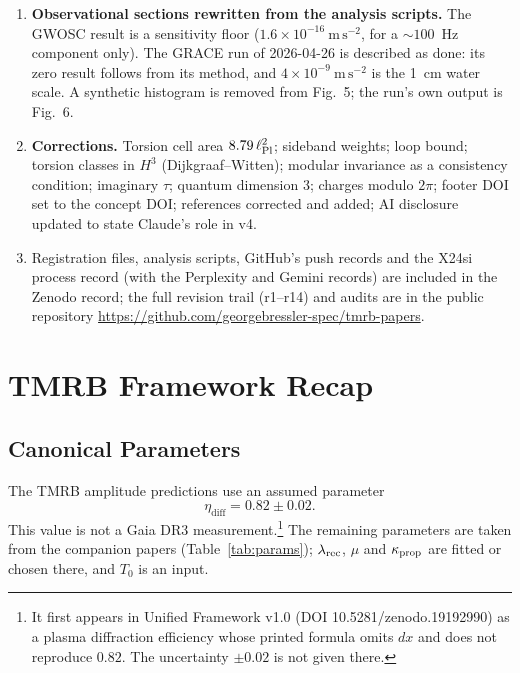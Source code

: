 \documentclass[11pt,a4paper]{article}
\begin{document}
\begin{enumerate}[leftmargin=*, label=\textit{(\roman*)}, itemsep=1pt, topsep=2pt]
    line widths for a non-spinning remnant, 0.15 at spin 0.7, at any mass); the prediction is a shortening of the damping time, given
    by remnant spin and fit start time in Table~\ref{tab:ringdown_spin} (exact Kerr
    frequencies).
  \item \textbf{Observational sections rewritten from the analysis scripts.} The GWOSC
    result is a sensitivity floor ($1.6\times10^{-16}~\mathrm{m\,s^{-2}}$, for a
    ${\sim}100$~Hz component only). The GRACE run of 2026-04-26 is described as done: its
    zero result follows from its method, and $4\times10^{-9}~\mathrm{m\,s^{-2}}$ is the
    1~cm water scale. A synthetic histogram is removed from Fig.~5; the run's own output
    is Fig.~6.
  \item \textbf{Corrections.} Torsion cell area $8.79\,\ell_{\rm Pl}^2$; sideband weights;
    loop bound; torsion classes in $H^3$ (Dijkgraaf--Witten); modular invariance as a
    consistency condition; imaginary $\tau$; quantum dimension 3; charges modulo $2\pi$;
    footer DOI set to the concept DOI; references corrected and added; AI disclosure
    updated to state Claude's role in v4.
  \item Registration files, analysis scripts, GitHub's push records and the X24si process
    record (with the Perplexity and Gemini records) are included in the Zenodo record; the
    full revision trail (r1--r14) and audits are in the public repository
    \url{https://github.com/georgebressler-spec/tmrb-papers}.
\end{enumerate}

\section{TMRB Framework Recap}
\label{sec:recap}

\subsection{Canonical Parameters}

The TMRB amplitude predictions use an assumed parameter
\begin{equation}
  \eta_{\mathrm{diff}} = 0.82 \pm 0.02.
  \label{eq:etadiff}
\end{equation}
This value is not a Gaia DR3 measurement.\footnote{It first appears in Unified Framework v1.0 (DOI 10.5281/zenodo.19192990) as a plasma diffraction efficiency whose printed formula omits $dx$ and does not reproduce $0.82$. The uncertainty $\pm 0.02$ is not given there.}
The remaining parameters are taken from the companion papers (Table~\ref{tab:params}); $\lambda_{\rm rec}$, $\mu$ and $\kappa_{\rm prop}$ are fitted or chosen there, and $T_0$ is an input.
\end{document}
